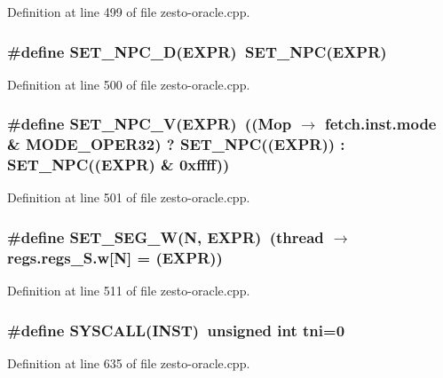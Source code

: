Definition at line 499 of file zesto-oracle.cpp.
\subsubsection[{SET\_\-NPC\_\-D}]{\setlength{\rightskip}{0pt plus 5cm}\#define SET\_\-NPC\_\-D(EXPR)~SET\_\-NPC(EXPR)}\label{zesto-oracle_8cpp_237e92c04084e04a6903083038b0d2b3}




Definition at line 500 of file zesto-oracle.cpp.
\subsubsection[{SET\_\-NPC\_\-V}]{\setlength{\rightskip}{0pt plus 5cm}\#define SET\_\-NPC\_\-V(EXPR)~((Mop $\rightarrow$ fetch.inst.mode \& MODE\_\-OPER32) ? SET\_\-NPC((EXPR)) : SET\_\-NPC((EXPR) \& 0xffff))}\label{zesto-oracle_8cpp_5df75989ea017f05abfeeaaca9c34c4b}




Definition at line 501 of file zesto-oracle.cpp.
\subsubsection[{SET\_\-SEG\_\-W}]{\setlength{\rightskip}{0pt plus 5cm}\#define SET\_\-SEG\_\-W(N, \/  EXPR)~(thread $\rightarrow$ regs.regs\_\-S.w[N] = (EXPR))}\label{zesto-oracle_8cpp_0e4a1562565f347b84caa32963258150}




Definition at line 511 of file zesto-oracle.cpp.
\subsubsection[{SYSCALL}]{\setlength{\rightskip}{0pt plus 5cm}\#define SYSCALL(INST)~unsigned int tni=0}\label{zesto-oracle_8cpp_72bc0399d2dd2ad179b9c5f0505551e2}




Definition at line 635 of file zesto-oracle.cpp.
